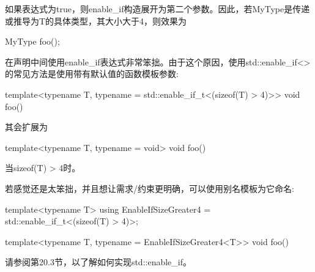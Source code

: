 如果表达式为true，则enable\_if构造展开为第二个参数。因此，若MyType是传递或推导为T的具体类型，其大小大于4，则效果为

\begin{cpp}
MyType foo();
\end{cpp}

在声明中间使用enable\_if表达式非常笨拙。由于这个原因，使用std::enable\_if<>的常见方法是使用带有默认值的函数模板参数: 

\begin{cpp}
template<typename T,
		typename = std::enable_if_t<(sizeof(T) > 4)>>
void foo() {
}
\end{cpp}

其会扩展为

\begin{cpp}
template<typename T,
		typename = void>
void foo() {
}
\end{cpp}

当sizeof(T) > 4时。

若感觉还是太笨拙，并且想让需求/约束更明确，可以使用别名模板为它命名:

\begin{cpp}
template<typename T>
using EnableIfSizeGreater4 = std::enable_if_t<(sizeof(T) > 4)>;

template<typename T,
	typename = EnableIfSizeGreater4<T>>
void foo() {
}
\end{cpp}

请参阅第20.3节，以了解如何实现std::enable\_if。










